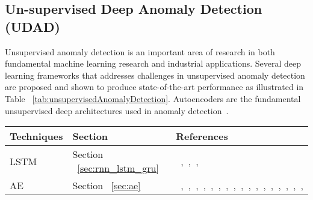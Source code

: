 \subsection{Un-supervised Deep Anomaly Detection (UDAD)}
\label{sec:unsupervisedDAD}
Unsupervised anomaly detection is an important area of research  in both fundamental machine learning research and industrial applications. Several deep learning frameworks that addresses  challenges in unsupervised anomaly detection are proposed and shown to produce state-of-the-art performance as illustrated in Table ~\ref{tab:unsupervisedAnomalyDetection}. Autoencoders are the fundamental  unsupervised deep architectures used in anomaly detection~\cite{baldi2012autoencoders}.

\begin{table*}
\begin{center}
\caption{Examples of  Un-supervised Deep Anomaly Detection (UDAD).
        \\CNN: Convolution Neural Networks, LSTM : Long Short Term Memory Networks
        \\DNN : Deep Neural Networks., GAN: Generative Adversarial Network
        \\AE: Autoencoders, DAE: Denoising Autoencoders, SVM: Support Vector Machines
        \\STN: Spatial Transformer Networks, RNN : Recurrent Neural Networks
        \\AAE: Adversarial Autoencoders, VAE : Variational Autoencoders.}
    \label{tab:unsupervisedAnomalyDetection}
    \begin{tabular}{ | l | p{2cm} | p{6cm} |}
    \hline
     \textbf{Techniques}  & \textbf{Section} & \textbf{References} \\ \hline
     LSTM & Section ~\ref{sec:rnn_lstm_gru} &  ~\cite{singh2017anomaly},~\cite{chandola2008comparative},~\cite{dasigi2014modeling},\cite{malhotra2015long}\\\hline
     AE & Section ~\ref{sec:ae} & ~\cite{abati2018and},~\cite{zong2018deep},~\cite{tagawa2015structured},~\cite{dau2014anomaly},~\cite{sakurada2014anomaly},~\cite{wu2015adaptive},~\cite{xu2015learning},~\cite{hawkins2002outlier},~\cite{zhao2015robust},~\cite{qi2014robust},~\cite{chalapathy2017robust},~\cite{yang2015unsupervised},~\cite{zhai2016deep},~\cite{lyudchik2016outlier},~\cite{lu2017unsupervised},~\cite{mehrotra2017deep},~\cite{meng2018relational},\cite{parchami2017using}\\\hline

\end{tabular}
\end{center}
\end{table*}

